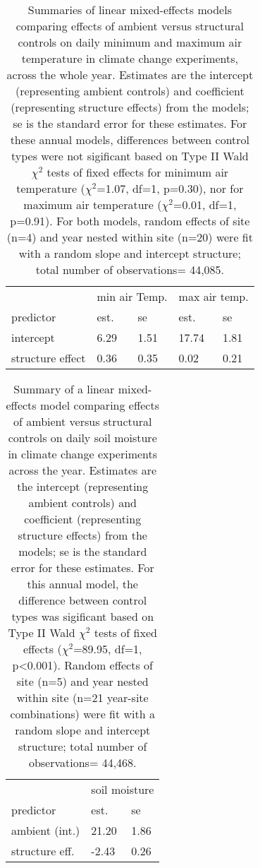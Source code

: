 \documentclass{article}
\begin{document}
\begin{table}[ht]
\centering
\caption{Summaries of linear mixed-effects models comparing effects of ambient versus structural controls on daily minimum and maximum air temperature in climate change experiments, across the whole year. Estimates are the intercept (representing ambient controls) and coefficient (representing structure effects) from the models; se is the standard error for these estimates. For these annual models, differences between control types were not sigificant based on Type II Wald $\chi^{2}$ tests of fixed effects for minimum air temperature ($\chi^{2}$=1.07, df=1, p=0.30), nor for maximum air temperature ($\chi^{2}$=0.01, df=1, p=0.91). For both models, random effects of site (n=4) and year nested within site (n=20) were fit with a random slope and intercept structure; total number of observations= 44,085.} 
\label{table:shamamb_airtemp}
\begin{tabular}{|p{}|p{}p{}|p{}p{}|}
  \hline
  &\multicolumn{2}{c}{min air Temp.} &\multicolumn{2}{c}{max air temp.}\\
 predictor & est. & se & est. & se\\
 \hline
intercept & 6.29 & 1.51 & 17.74 & 1.81 \\ 
  structure effect & 0.36 & 0.35 & 0.02 & 0.21 \\ 
   \hline
\end{tabular}
\end{table}
\begin{table}[ht]
\centering
\caption{Summary of a linear mixed-effects model comparing effects of ambient versus structural controls on daily soil moisture in climate change experiments across the year. Estimates are the intercept (representing ambient controls) and coefficient (representing structure effects) from the models; se is the standard error for these estimates. For this annual model, the difference between control types was sigificant based on Type II Wald $\chi^{2}$ tests of fixed effects ($\chi^{2}$=89.95, df=1, p<0.001). Random effects of site (n=5) and year nested within site (n=21 year-site combinations) were fit with a random slope and intercept structure; total number of observations= 44,468.} 
\label{table:shamamb_soilmois}
\begin{tabular}{|p{}|p{}p{}|}
  \hline
  &\multicolumn{2}{c}{soil moisture}\\
 predictor & est. & se\\
 \hline
ambient (int.) & 21.20 & 1.86 \\ 
  structure eff. & -2.43 & 0.26 \\ 
   \hline
\end{tabular}
\end{table}\clearpage
\end{document}
